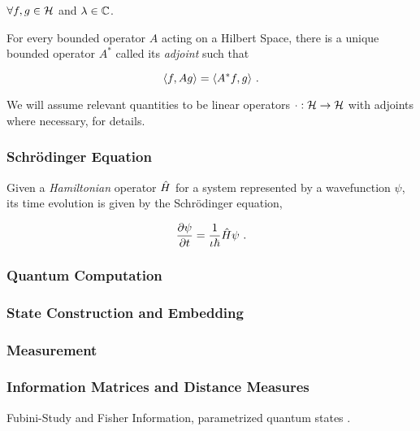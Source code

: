\(\forall f, g \in \mathcal{H}\) and \(\lambda \in \mathbb{C}\). 

For every bounded operator \(A\) acting on a Hilbert Space, there is a unique
bounded operator \(A^*\) called its \emph{adjoint} such that

\begin{equation*}
    \langle f, Ag\rangle = \langle A^*f, g\rangle~.
\end{equation*}

We will assume relevant quantities to be linear operators \(\cdot :
\mathcal{H} \to \mathcal{H}\) with adjoints where necessary,
\cite[see][Appendix A]{hall2013quantum} for details.

\subsubsection{Schr\"odinger Equation}
Given a \emph{Hamiltonian} operator \(\hat{H}\) for a system represented by
a wavefunction \(\psi\), its time evolution is given by the Schr\"odinger
equation,

\begin{equation}
    \frac{\partial{\psi}}{\partial{t}} = \frac{1}{\iota\hbar} \hat{H} \psi~.
    \label{eq:schrodinger}
\end{equation}

\subsubsection{Quantum Computation}

\subsubsection{State Construction and Embedding}

\subsubsection{Measurement}

\subsubsection{Information Matrices and Distance Measures}
\label{subsubsec:distanceinfo}

Fubini-Study and Fisher Information, parametrized quantum states
\cite{meyer2021fisher}.